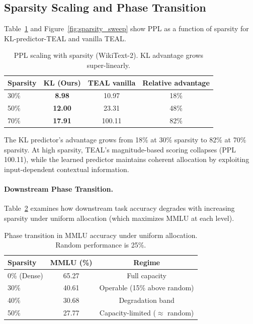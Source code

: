 \subsection{Sparsity Scaling and Phase Transition}
\label{sec:scaling}

Table~\ref{tab:scaling} and Figure~\ref{fig:sparsity_sweep} show PPL as a function of sparsity for KL-predictor-TEAL and vanilla TEAL.

\begin{table}[t]
\centering
\caption{PPL scaling with sparsity (WikiText-2). KL advantage grows super-linearly.}
\label{tab:scaling}
\small
\begin{tabular}{lccc}
\toprule
Sparsity & KL (Ours) & TEAL vanilla & Relative advantage \\
\midrule
30\% & \textbf{8.98} & 10.97 & 18\% \\ %
50\% & \textbf{12.00} & 23.31 & 48\% \\ %
70\% & \textbf{17.91} & 100.11 & 82\% \\ %
\bottomrule
\end{tabular}
\end{table}

The KL predictor's advantage grows from 18\% at 30\% sparsity to 82\% at 70\% sparsity.
At high sparsity, TEAL's magnitude-based scoring collapses (PPL 100.11), while the learned predictor maintains coherent allocation by exploiting input-dependent contextual information.

\paragraph{Downstream Phase Transition.}
Table~\ref{tab:phase} examines how downstream task accuracy degrades with increasing sparsity under uniform allocation (which maximizes MMLU at each level).

\begin{table}[t]
\centering
\caption{Phase transition in MMLU accuracy under uniform allocation. Random performance is 25\%.}
\label{tab:phase}
\small
\begin{tabular}{lcc}
\toprule
Sparsity & MMLU (\%) & Regime \\
\midrule
0\% (Dense) & 65.27 & Full capacity \\
30\% & 40.61 & Operable (15\% above random) \\ %
40\% & 30.68 & Degradation band \\ %
50\% & 27.77 & Capacity-limited ($\approx$ random) \\ %
\bottomrule
\end{tabular}
\end{table}

